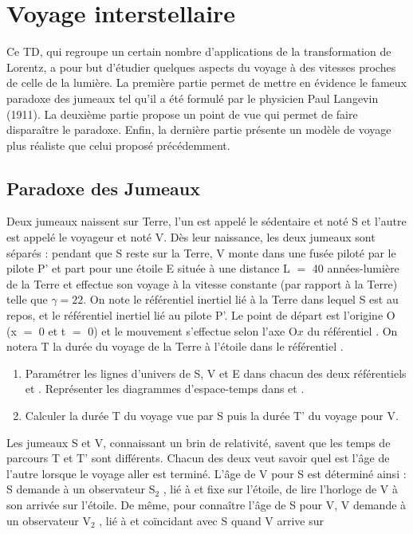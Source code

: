 \chapter{Voyage interstellaire}
Ce TD, qui regroupe un certain nombre d’applications de la transformation de Lorentz, a
pour but d’étudier quelques aspects du voyage à des vitesses proches de celle de la lumière. La
première partie permet de mettre en évidence le fameux paradoxe des jumeaux tel qu’il a été
formulé par le physicien Paul Langevin (1911). La deuxième partie propose un point de vue qui
permet de faire disparaître le paradoxe. Enfin, la dernière partie présente un modèle de voyage
plus réaliste que celui proposé précédemment.
\section{Paradoxe des Jumeaux} %
Deux jumeaux naissent sur Terre, l’un est appelé le sédentaire et noté S et l’autre est appelé
le voyageur et noté V. Dès leur naissance, les deux jumeaux sont séparés : pendant que S reste
sur la Terre, V monte dans une fusée piloté par le pilote P' et part pour une étoile E située à
une distance L $=$ 40 années-lumière de la Terre et effectue son voyage à la vitesse constante 
(par rapport à la Terre) telle que $\gamma = 22$. On note  le référentiel inertiel lié à la Terre dans
lequel S est au repos, et  le référentiel inertiel lié au pilote P'. Le point de départ est l’origine
O (x $=$ 0 et t $=$ 0) et le mouvement s’effectue selon l’axe O$x$ du référentiel . On notera T la
durée du voyage de la Terre à l’étoile dans le référentiel .
\begin{enumerate}
  \item Paramétrer les lignes d’univers de S, V et E dans chacun des deux référentiels  et  .
Représenter les diagrammes d’espace-temps dans  et  .
  \item Calculer la durée T du voyage vue par S puis la durée T' du voyage pour V.
\setcounter{numero}{\theenumi}\end{enumerate}
Les jumeaux S et V, connaissant un brin de relativité, savent que les temps de parcours T et
T' sont différents. Chacun des deux veut savoir quel est l’âge de l’autre lorsque le voyage aller
est terminé. L’âge de V pour S est déterminé ainsi : S demande à un observateur S$_2$ , lié à  et
fixe sur l’étoile, de lire l’horloge de V à son arrivée sur l’étoile. De même, pour connaître l’âge
de S pour V, V demande à un observateur V$_2$ , lié à  et coïncidant avec S quand V arrive sur
